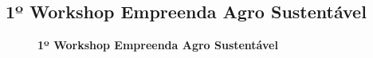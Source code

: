 \begin{apendicesenv}
\chapter{1º Workshop Empreenda Agro Sustentável}
\label{app:workshop_1}

\begin{figure}[H]
\FloatBarrier
\center
\caption{\textbf{1º Workshop Empreenda Agro Sustentável}}
\qquad
{}
\qquad
\qquad

\end{figure}
\end{apendicesenv}
